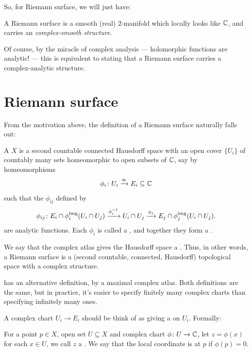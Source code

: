 So, for Riemann surface, we will just have:
\begin{moral}
	A Riemann surface is a smooth (real) $2$-manifold which locally looks like $\mathbb C$, and carries an
	\emph{complex-smooth structure}.
\end{moral}

Of course, by the miracle of complex analysis --- holomorphic functions are analytic! --- this is
equivalent to stating that a Riemann surface carries a complex-analytic structure.

\section{Riemann surface}

From the motivation above, the definition of a Riemann surface naturally falls out:
\begin{definition}
	A  $X$ is a second countable connected Hausdorff space with an open cover
	$\{ U_i \}$ of countably many sets homeomorphic to open subsets of $\mathbb C$, say by homeomorphisms
	\[ \phi_i \colon U_i \xrightarrow{\cong} E_i \subseteq \mathbb C \]
	such that the  $\phi_{ij}$ defined by
	\[
		\phi_{ij} \colon E_i \cap \phi_i^{\text{img}}(U_i \cap U_j)
		\xrightarrow{\phi_i^{-1}}
		U_i \cap U_j
		\xrightarrow{\phi_j} E_j \cap \phi_j^{\text{img}}(U_i \cap U_j).
	\]
	are analytic functions.
	Each $\phi_i$ is called a , and together they form a .
\end{definition}

We say that the complex atlas gives the Hausdorff space a .
Thus, in other words, a Riemann surface is a (second countable, connected, Hausdorff) topological
space with a complex structure.

\cite{ref:miranda} has an alternative definition, by a maximal complex atlas. Both definitions are the same,
but in practice, it's easier to specify finitely many complex charts than specifying infinitely many
ones.

A complex chart $U_i \to E_i$ should be think of as giving a  on $U_i$.
Formally:
\begin{definition}
	For a point $p \in X$, open set $U \subseteq X$ and complex chart $\phi \colon U \to \mathbb C$,
	let $z = \phi(x)$ for each $x \in U$, we call $z$ a .
	We say that the local coordinate is  at $p$ if $\phi(p) = 0$.
\end{definition}

